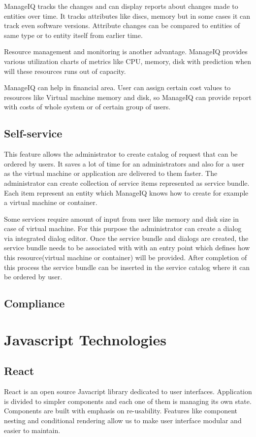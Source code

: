 ManageIQ tracks the changes and can display reports about changes made to entities over time. It tracks attributes like discs, memory but in some cases it can track even software versions. Attribute changes can be compared to entities of same type or to entity itself from earlier time.

Resource management and monitoring is another advantage. ManageIQ provides various utilization charts of metrics like CPU, memory, disk with prediction when will these resources runs out of capacity.

ManageIQ can help in financial area. User can assign certain cost values to resources like Virtual machine memory and disk, so ManageIQ can provide report with costs of whole system or of certain group of users.

\section{Self-service}
This feature allows the administrator to create catalog of request that can be ordered by users. It saves a lot of time for an administrators and also for a user as the virtual machine or application are delivered to them faster. The administrator can create collection of service items represented as service bundle. Each item represent an entity which ManageIQ knows how to create for example a virtual machine or container. 

Some services require amount of input from user like memory and disk size in case of virtual machine. For this purpose the administrator can create a dialog via integrated dialog editor. Once the service bundle and dialogs are created, the service bundle needs to be associated with with an entry point which defines how this resource(virtual machine or container) will be provided. After completion of this process the service bundle can be inserted in the service catalog where it can be ordered by user. 


\section{Compliance}

\chapter{Javascript Technologies}

\section{React}
React is an open source Javacript library dedicated to user interfaces. Application is divided to simpler components and each one of them is managing its own state. Components are built with emphasis on re-usability. Features like component nesting and conditional rendering allow us to make user interface modular and easier to maintain.

